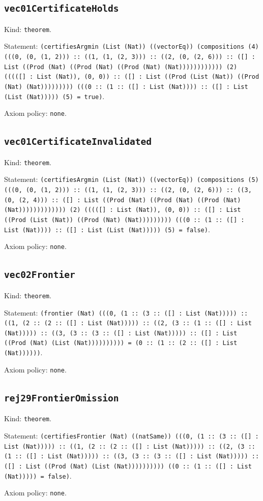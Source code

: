 \documentclass[11pt]{article}
\begin{document}
\subsection*{\texttt{vec01CertificateHolds}}
\noindent Kind: \texttt{theorem}.\par
\noindent Statement: \texttt{(certifiesArgmin (List (Nat)) ((vectorEq)) (compositions (4) (((0, (0, (1, 2))) :: ((1, (1, (2, 3))) :: ((2, (0, (2, 6))) :: ([] : List ((Prod (Nat) ((Prod (Nat) ((Prod (Nat) (Nat)))))))))))) (2) (((([] : List (Nat)), (0, 0)) :: ([] : List ((Prod (List (Nat)) ((Prod (Nat) (Nat))))))))) (((0 :: (1 :: ([] : List (Nat)))) :: ([] : List (List (Nat))))) (5) = true)}.\par
\noindent Axiom policy: \texttt{none}.\par
\subsection*{\texttt{vec01CertificateInvalidated}}
\noindent Kind: \texttt{theorem}.\par
\noindent Statement: \texttt{(certifiesArgmin (List (Nat)) ((vectorEq)) (compositions (5) (((0, (0, (1, 2))) :: ((1, (1, (2, 3))) :: ((2, (0, (2, 6))) :: ((3, (0, (2, 4))) :: ([] : List ((Prod (Nat) ((Prod (Nat) ((Prod (Nat) (Nat))))))))))))) (2) (((([] : List (Nat)), (0, 0)) :: ([] : List ((Prod (List (Nat)) ((Prod (Nat) (Nat))))))))) (((0 :: (1 :: ([] : List (Nat)))) :: ([] : List (List (Nat))))) (5) = false)}.\par
\noindent Axiom policy: \texttt{none}.\par
\subsection*{\texttt{vec02Frontier}}
\noindent Kind: \texttt{theorem}.\par
\noindent Statement: \texttt{(frontier (Nat) (((0, (1 :: (3 :: ([] : List (Nat))))) :: ((1, (2 :: (2 :: ([] : List (Nat))))) :: ((2, (3 :: (1 :: ([] : List (Nat))))) :: ((3, (3 :: (3 :: ([] : List (Nat))))) :: ([] : List ((Prod (Nat) (List (Nat)))))))))) = (0 :: (1 :: (2 :: ([] : List (Nat))))))}.\par
\noindent Axiom policy: \texttt{none}.\par
\subsection*{\texttt{rej29FrontierOmission}}
\noindent Kind: \texttt{theorem}.\par
\noindent Statement: \texttt{(certifiesFrontier (Nat) ((natSame)) (((0, (1 :: (3 :: ([] : List (Nat))))) :: ((1, (2 :: (2 :: ([] : List (Nat))))) :: ((2, (3 :: (1 :: ([] : List (Nat))))) :: ((3, (3 :: (3 :: ([] : List (Nat))))) :: ([] : List ((Prod (Nat) (List (Nat)))))))))) ((0 :: (1 :: ([] : List (Nat))))) = false)}.\par
\noindent Axiom policy: \texttt{none}.\par
\end{document}
